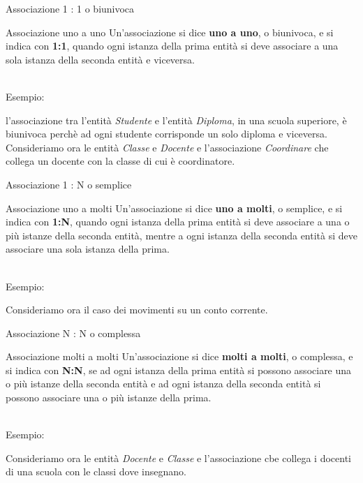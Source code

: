 %
\begin{frame}{Associazione 1 : 1 o biunivoca}
\begin{minipage}{0.9\textwidth}
\begin{block}{Associazione uno a uno}
Un'associazione si dice \textbf{uno a uno}, o biunivoca, e si indica con \textbf{1:1}, quando ogni istanza della prima entit\`a si deve associare a una sola istanza della seconda entit\`a e viceversa.
\end{block}
\end{minipage}
\pause
\newline
\\Esempio:

l'associazione tra l'entit\`a \textit{Studente} e l'entit\`a \textit{Diploma}, in una scuola superiore, \`e biunivoca perch\`e ad ogni studente corrisponde un solo diploma e viceversa.
\newline
\\ Consideriamo ora le entit\`a \textit{Classe} e \textit{Docente} e l'associazione \textit{Coordinare} che collega un docente con la classe di cui \`e coordinatore.
\end{frame}
%
\begin{frame}{Associazione 1 : N o semplice}
\begin{minipage}{0.9\textwidth}
\begin{block}{Associazione uno a molti}
Un'associazione si dice \textbf{uno a molti}, o semplice, e si indica con \textbf{1:N}, quando ogni istanza della prima entit\`a si deve associare a una o pi\`u istanze della seconda entit\`a, mentre a ogni istanza della seconda entit\`a si deve associare una sola istanza della prima.
\end{block}
\end{minipage}
\pause
\newline
\\Esempio:

Consideriamo ora il caso dei movimenti su un conto corrente.
\end{frame}
%
\begin{frame}{Associazione N : N o complessa}
\begin{minipage}{0.9\textwidth}
\begin{block}{Associazione molti a molti}
Un'associazione si dice \textbf{molti a molti}, o complessa, e si indica con \textbf{N:N}, se ad ogni istanza della prima entit\`a si possono associare una o pi\`u istanze della seconda entit\`a e ad ogni istanza della seconda entit\`a si possono associare una o pi\`u istanze della prima.
\end{block}
\end{minipage}
\pause
\newline
\\Esempio:

Consideriamo ora le entit\`a \textit{Docente} e \textit{Classe} e l'associazione cbe collega i docenti di una scuola con le classi dove insegnano.
\end{frame}

